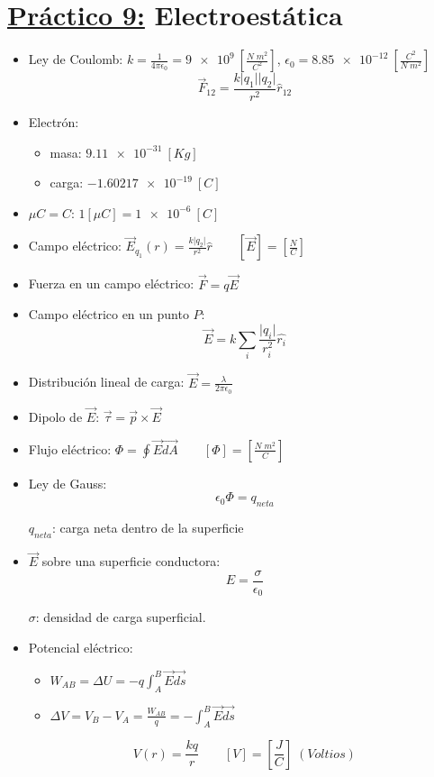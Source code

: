 \documentclass[12pt,a4paper]{article}
\providecommand{\abs}[1]{\lvert#1\rvert}
\newcommand{\PN}{\par\noindent}
\begin{document}
	\section*{\underline{Práctico 9:} Electroestática}
		\begin{multicols}{2}
			\begin{itemize}
				\item Ley de Coulomb: $k = \frac{1}{4 \pi \epsilon_{0}} = \SI{9e9}{} [\frac{N \; m^{2}}{C^{2}}] $,
					$\epsilon_{0} = \SI{8.85e-12}{} [\frac{C^{2}}{N \; m^{2}}]$
					\[
						\vec{F}_{12} = \frac{k \abs{q_{1}} \abs{q_{2}}}{r^{2}} \hat{r}_{12}
					\]
				\item Electrón:
					\begin{itemize}
						\item masa: $\SI{9.11e-31}{} [Kg]$
						\item carga: $- \SI{1.60217e-19}{} [C]$
					\end{itemize}
				\item $\mu C = C$: $1 [\mu C] = \SI{1e-6}{}[C]$
				\item Campo eléctrico: $\vec{E}_{q_{1}}(r) = \frac{k\abs{q_{2}}}{r^{2}} \hat{r} \qquad [\vec{E}] = [\frac{N}{C}]$
				\item Fuerza en un campo eléctrico: $\vec{F} = q \vec{E}$
				\item Campo eléctrico en un punto $P$:
					\[
						\vec{E} = k \sum_{i} \frac{\abs{q_{i}}}{r^{2}_{i}} \hat{r_{i}}
					\]
				\item Distribución lineal de carga: $\vec{E} = \frac{\lambda}{2\pi\epsilon_{0}}$
				\item Dipolo de $\vec{E}$: $\vec{\tau} = \vec{p} \times \vec{E}$
				\item Flujo eléctrico: $\Phi = \oint \vec{E} \vec{dA} \qquad [\Phi] = [\frac{N\; m^{2}}{C}]$
				\item Ley de Gauss:
					\[
						\epsilon_{0} \Phi = q_{neta}
					\]
					\PN $q_{neta}$: carga neta dentro de la superficie
				\item $\vec{E}$ sobre una superficie conductora:
					\[
						E = \frac{\sigma}{\epsilon_{0}}
					\]
					\PN $\sigma$: densidad de carga superficial.
				\item Potencial eléctrico:
					\begin{itemize}
						\item $W_{AB} = \Delta U = -q \int_{A}^{B} \vec{E} \vec{ds}$
						\item $\Delta V = V_{B} - V_{A} = \frac{W_{AB}}{q} = - \int_{A}^{B} \vec{E} \vec{ds}$
					\end{itemize}
					\[
						V(r) = \frac{kq}{r} \qquad [V] = [\frac{J}{C}] \; (Voltios)
					\]
			\end{itemize}
		\end{multicols}
\end{document}
